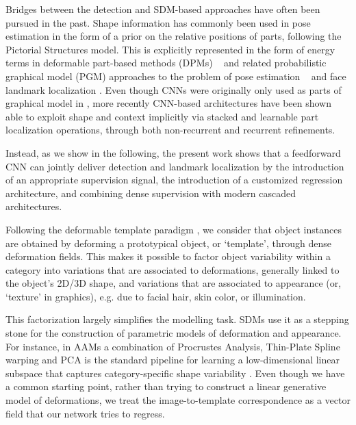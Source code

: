 Bridges between the detection and SDM-based approaches have often been pursued in the past.
Shape information has commonly been used in pose estimation in the form of a prior on the relative positions of parts, following the Pictorial Structures model\cite{fischler1973representation}. This is explicitly represented in the form of energy terms in deformable part-based methods
(DPMs) ~\cite{felzenszwalb2008discriminatively} and related probabilistic graphical model (PGM) approaches to the problem of pose estimation ~\cite{andriluka2009pictorial,sapp2010adaptive,yang2011articulated,sapp2013modec} and face landmark localization \cite{zhu2012face}. Even though CNNs were originally only used as parts of graphical model in \cite{jain2013learning,tompson2014joint,chen2014articulated,yang2016end},  more recently CNN-based architectures have been shown able to exploit shape and context implicitly via  stacked and  learnable part localization operations, through both non-recurrent \cite{wei2016convolutional,bulat2016human,newell2016stacked} and recurrent \cite{belagiannis2016recurrent} refinements. 

Instead, as we show in the following,  the present work shows that a feedforward CNN can jointly deliver detection and landmark localization by the introduction of an appropriate supervision signal, the introduction of a customized regression architecture, and combining dense supervision with modern cascaded architectures. 

Following the deformable template paradigm \cite{yuille1991deformable,Grenander1991}, we consider that object instances are obtained by deforming a prototypical object, or `template', through  dense deformation fields. 
This makes it possible  to factor  object variability within a category into variations that are associated to  deformations, generally linked to the object's 2D/3D shape, and variations that are associated to appearance (or, `texture' in graphics), e.g. due to facial hair, skin color, or illumination. 

This factorization largely simplifies the  modelling task. SDMs use it as a stepping stone for the construction of parametric models of deformation and appearance. For instance, in AAMs a combination of Procrustes Analysis, Thin-Plate Spline warping and PCA is the standard pipeline for learning a low-dimensional linear subspace that captures category-specific shape variability \cite{cootes2001active}. Even though we have a common starting point, rather than trying to construct a linear generative model of deformations, we treat the image-to-template correspondence as a vector field that our network tries to regress.

